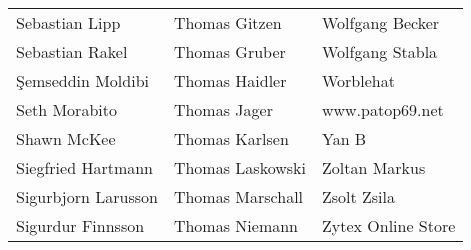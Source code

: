 \begin{small}
\begin{tabular}{p{4cm}p{4cm}p{4cm}}
Sebastian Lipp & Thomas Gitzen & Wolfgang Becker \\
Sebastian Rakel & Thomas Gruber & Wolfgang Stabla \\
Şemseddin Moldibi & Thomas Haidler & Worblehat \\
Seth Morabito & Thomas Jager & www.patop69.net \\
Shawn McKee & Thomas Karlsen & Yan B \\
Siegfried Hartmann & Thomas Laskowski & Zoltan Markus \\
Sigurbjorn Larusson & Thomas Marschall & Zsolt Zsila \\
Sigurdur Finnsson & Thomas Niemann & Zytex Online Store \\
\end{tabular}
\end{small}
